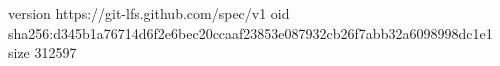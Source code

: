 version https://git-lfs.github.com/spec/v1
oid sha256:d345b1a76714d6f2e6bec20ccaaf23853e087932cb26f7abb32a6098998dc1e1
size 312597
